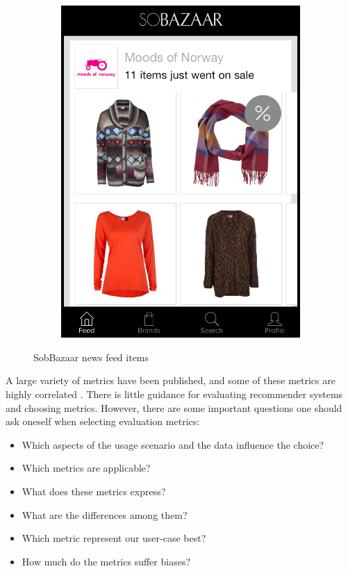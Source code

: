 \begin{figure}[H]
\begin{subfigure}[b]{.45\linewidth}
			\includegraphics[scale=0.25]{image/SoBazaarsale.png}
		\end{subfigure}
		\caption[Sobazaar News Feed - Version 0.5.1]{SobBazaar news feed items}
		\label{figure:sobazarfeed}
\end{figure}

A large variety of metrics have been published, and some of these metrics are highly correlated \cite{Herlocker2004}.
There is little guidance for evaluating recommender systems and choosing metrics. However, there are
some important questions one should ask oneself when selecting evaluation metrics:

\begin{itemize}
	\item Which aspects of the usage scenario and the data influence the choice?
	\item Which metrics are applicable?
	\item What does these metrics express?
	\item What are the differences among them?
	\item Which metric represent our user-case best?
	\item How much do the metrics suffer biases?
\end{itemize}

